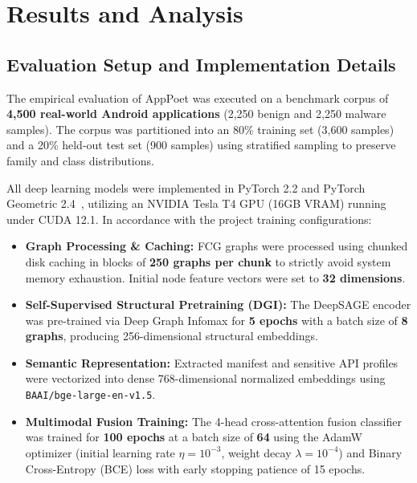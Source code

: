 \documentclass[12pt,a4paper,oneside]{report}
\begin{document}
\clearpage
\chapter{Results and Analysis}
\section{Evaluation Setup and Implementation Details}
The empirical evaluation of AppPoet was executed on a benchmark corpus of \textbf{4,500 real-world Android applications} (2,250 benign and 2,250 malware samples). The corpus was partitioned into an 80\% training set (3,600 samples) and a 20\% held-out test set (900 samples) using stratified sampling to preserve family and class distributions.

All deep learning models were implemented in PyTorch 2.2 and PyTorch Geometric 2.4~\cite{ref15}, utilizing an NVIDIA Tesla T4 GPU (16GB VRAM) running under CUDA 12.1. In accordance with the project training configurations:
\begin{itemize}
    \item \textbf{Graph Processing \& Caching:} FCG graphs were processed using chunked disk caching in blocks of \textbf{250 graphs per chunk} to strictly avoid system memory exhaustion. Initial node feature vectors were set to \textbf{32 dimensions}.
    \item \textbf{Self-Supervised Structural Pretraining (DGI):} The DeepSAGE encoder was pre-trained via Deep Graph Infomax for \textbf{5 epochs} with a batch size of \textbf{8 graphs}, producing 256-dimensional structural embeddings.
    \item \textbf{Semantic Representation:} Extracted manifest and sensitive API profiles were vectorized into dense 768-dimensional normalized embeddings using \texttt{BAAI/bge-large-en-v1.5}.
    \item \textbf{Multimodal Fusion Training:} The 4-head cross-attention fusion classifier was trained for \textbf{100 epochs} at a batch size of \textbf{64} using the AdamW optimizer (initial learning rate $\eta = 10^{-3}$, weight decay $\lambda = 10^{-4}$) and Binary Cross-Entropy (BCE) loss with early stopping patience of 15 epochs.
\end{itemize}
\end{document}
